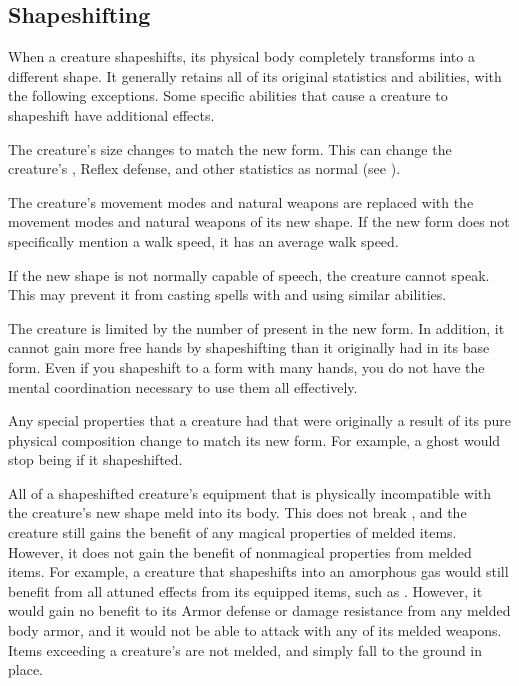   \subsection{Shapeshifting}\label{Shapeshifting}
    When a creature shapeshifts, its physical body completely transforms into a different shape.
    It generally retains all of its original statistics and abilities, with the following exceptions.
    Some specific abilities that cause a creature to shapeshift have additional effects.
    \begin{raggeditemize}
      \item The creature's size changes to match the new form.
        This can change the creature's , Reflex defense, and other statistics as normal (see ).
      \item The creature's  movement modes and natural weapons are replaced with the movement modes and natural weapons of its new shape.
        If the new form does not specifically mention a walk speed, it has an average walk speed.
      \item If the new shape is not normally capable of speech, the creature cannot speak.
        This may prevent it from casting spells with  and using similar abilities.
      \item The creature is limited by the number of  present in the new form.
        In addition, it cannot gain more free hands by shapeshifting than it originally had in its base form.
        Even if you shapeshift to a form with many hands, you do not have the mental coordination necessary to use them all effectively.
      \item Any special properties that a creature had that were originally a result of its pure physical composition change to match its new form.
        For example, a ghost would stop being  if it shapeshifted.
    \end{raggeditemize}

    All of a shapeshifted creature's equipment that is physically incompatible with the creature's new shape meld into its body.
    This does not break , and the creature still gains the benefit of any magical properties of melded items.
    However, it does not gain the benefit of nonmagical properties from melded items.
    For example, a creature that shapeshifts into an amorphous gas would still benefit from all attuned effects from its equipped items, such as .
    However, it would gain no benefit to its Armor defense or damage resistance from any melded body armor, and it would not be able to attack with any of its melded weapons.
    Items exceeding a creature's  are not melded, and simply fall to the ground in place.


